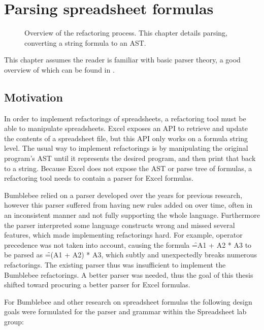 
\chapter{Parsing spreadsheet formulas}
\label{chapter:parsing}

\noindent
\begin{figure}[h]
\centerfloat

\caption{Overview of the refactoring process. This chapter details parsing, converting a string formula to an AST.}
\end{figure}


\noindent
This chapter assumes the reader is familiar with basic parser theory, a good overview of which can be found in \cite{dragonbook}.

\section{Motivation}
\label{sec:motivation}

In order to implement refactorings of spreadsheets, a refactoring tool must be able to manipulate spreadsheets.
Excel exposes an API to retrieve and update the contents of a spreadsheet file, but this API only works on a formula string level.
The usual way to implement refactorings is by manipulating the original program's AST until it represents the desired program, and then print that back to a string.
Because Excel does not expose the AST or parse tree of formulas, a refactoring tool needs to contain a parser for Excel formulas.

Bumblebee relied on a parser developed over the years for previous research, however this parser suffered from having new rules added on over time, often in an inconsistent manner and not fully supporting the whole language.
Furthermore the parser interpreted some language constructs wrong and missed several features, which made implementing refactorings hard.
For example, operator precedence was not taken into account, causing the formula \f{=A1 + A2 * A3} to be parsed as \f{=(A1 + A2) * A3}, which subtly and unexpectedly breaks numerous refactorings.
The existing parser thus was insufficient to implement the Bumblebee refactorings.
A better parser was needed, thus the goal of this thesis shifted toward procuring a better parser for Excel formulas.

For Bumblebee and other research on spreadsheet formulas the following design goals were formulated for the parser and grammar within the Spreadsheet lab group:


